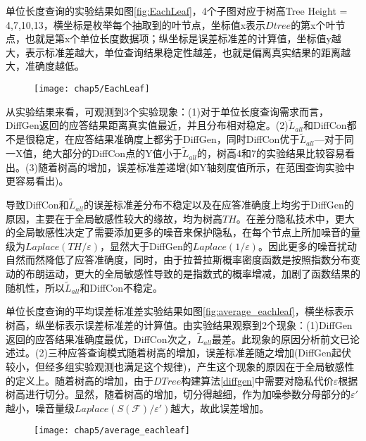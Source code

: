 单位长度查询的实验结果如图\ref{fig:EachLeaf}，4个子图对应于树高Tree Height = 4,7,10,13，横坐标是枚举每个抽取到的叶节点，坐标值x表示$Dtree$的第x个叶节点，也就是第x个单位长度数据项；纵坐标是误差标准差的计算值，坐标值y越大，表示标准差越大，单位查询结果稳定性越差，也就是偏离真实结果的距离越大，准确度越低。

\begin{figure}[!htp]
	\centering
	\texttt{[image: chap5/EachLeaf]}
\end{figure}

从实验结果来看，可观测到3个实验现象：(1)对于单位长度查询需求而言，DiffGen返回的应答结果距离真实值最近，并且分布相对稳定。(2)$\tilde{L}_{all}$和DiffCon都不是很稳定，在应答结果准确度上都劣于DiffGen，同时DiffCon优于$\tilde{L}_{all}$---对于同一X值，绝大部分的DiffCon点的Y值小于$\tilde{L}_{all}$的，树高4和7的实验结果比较容易看出。(3)随着树高的增加，误差标准差递增(如Y轴刻度值所示，在范围查询实验中更容易看出)。

导致DiffCon和$\tilde{L}_{all}$的误差标准差分布不稳定以及在应答准确度上均劣于DiffGen的原因，主要在于全局敏感性较大的缘故，均为树高$TH$。在差分隐私技术中，更大的全局敏感性决定了需要添加更多的噪音来保护隐私，在每个节点上所加噪音的量级为$Laplace(TH/\varepsilon)$，显然大于DiffGen的$Laplace(1/\varepsilon)$。因此更多的噪音扰动自然而然降低了应答准确度，同时，由于拉普拉斯概率密度函数是按照指数分布变动的布朗运动，更大的全局敏感性导致的是指数式的概率增减，加剧了函数结果的随机性，所以$\tilde{L}_{all}$和DiffCon不稳定。

单位长度查询的平均误差标准差实验结果如图\ref{fig:average_eachleaf}，横坐标表示树高，纵坐标表示误差标准差的计算值。由实验结果观察到2个现象：(1)DiffGen返回的应答结果准确度最优，DiffCon次之，$\tilde{L}_{all}$最差。此现象的原因分析前文已论述过。(2)三种应答查询模式随着树高的增加，误差标准差随之增加(DiffGen起伏较小，但经多组实验观测也满足这个规律)，产生这个现象的原因在于全局敏感性的定义上。随着树高的增加，由于$DTree$构建算法\ref{diffgen}中需要对隐私代价$\varepsilon$根据树高进行切分。显然，随着树高的增加，切分得越细，作为加噪参数分母部分的${\varepsilon}'$越小，噪音量级$Laplace(S(\mathcal{F})/{\varepsilon}')$越大，故此误差增加。

\begin{figure}[!htp]
	\centering
	\texttt{[image: chap5/average\_eachleaf]}
\end{figure}



